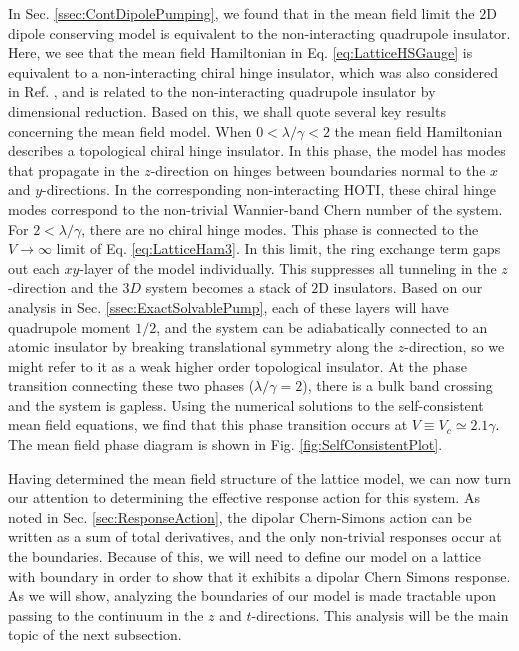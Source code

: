 \documentclass[prb,aps,twocolumn,groupaddress,floatfix]{revtex4-1}
\begin{document}
In Sec. \ref{ssec:ContDipolePumping}, we found that in the mean field limit the $2$D dipole conserving model is equivalent to the non-interacting quadrupole insulator. Here, we see that the mean field Hamiltonian in Eq. \ref{eq:LatticeHSGauge} is equivalent to a non-interacting chiral hinge insulator, which was also considered in Ref. , and is related to the non-interacting quadrupole insulator by dimensional reduction. Based on this, we shall quote several key results concerning the mean field model. When $0<\lambda/\gamma < 2$ the mean field Hamiltonian describes a topological chiral hinge insulator. In this phase, the model has modes that propagate in the $z$-direction on hinges between boundaries normal to the $x$  and $y$-directions. In the corresponding non-interacting HOTI, these chiral hinge modes correspond to the non-trivial Wannier-band Chern number of the system. For $2<\lambda/\gamma$, there are no chiral hinge modes. This phase is connected to the $V\rightarrow \infty$ limit of Eq. \ref{eq:LatticeHam3}. In this limit, the ring exchange term gaps out each $xy$-layer of the model individually. This suppresses all tunneling in the $z$-direction and the $3D$ system becomes a  stack of $2$D insulators. Based on our analysis in Sec. \ref{ssec:ExactSolvablePump}, each of these layers will have quadrupole moment $1/2$, and the system can be adiabatically connected to an atomic insulator by breaking translational symmetry along the $z$-direction, so we might refer to it as a weak higher order topological insulator. At the phase transition connecting these two phases ($\lambda/\gamma = 2$), there is a bulk band crossing and the system is gapless. Using the numerical solutions to the self-consistent mean field equations, we find that this phase transition occurs at $V \equiv V_c \simeq 2.1\gamma$. The mean field phase diagram is shown in Fig. \ref{fig:SelfConsistentPlot}.


Having determined the mean field structure of the lattice model, we can now turn our attention to determining the effective response action for this system. As noted in Sec. \ref{sec:ResponseAction}, the dipolar Chern-Simons action can be written as a sum of total derivatives, and the only non-trivial responses occur at the boundaries. Because of this, we will need to define our model on a lattice with boundary in order to show that it exhibits a dipolar Chern Simons response. As we will show, analyzing the boundaries of our model is made tractable upon passing to the continuum in the $z$ and $t$-directions. This analysis will be the main topic of the next subsection.
\end{document}
